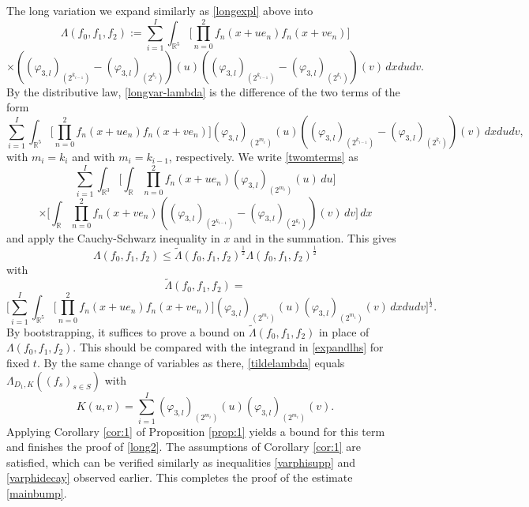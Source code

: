 \documentclass[12pt,reqno]{amsart}
\theoremstyle{plain}
\theoremstyle{definition}
\numberwithin{equation}{section}
\newcommand{\R}{{\mathbb R}}
\begin{document}
The long variation we expand similarly as  \eqref{longexpl} above into
\begin{equation}
    \label{longvar-lambda}
    \Lambda(f_0,f_1,f_2):= 
 \sum_{i=1}^I  \int_{\mathbb{R}^5} \Big[\prod_{n=0}^2 f_n(x+ue_n) 
f_n(x+ve_n) \Big]  \end{equation}
\[\times({(\varphi_{3,l})}_{(2^{k_{i-1}})}-{(\varphi_{3,l})}_{(2^{k_{i}})})(u) ({(\varphi_{3,l})}_{(2^{k_{i-1}})}-{(\varphi_{3,l})}_{(2^{k_{i}})})(v)
 \,dx du dv. \] 
By the distributive law, \eqref{longvar-lambda} is the difference of the two terms of the form
\begin{equation}\label{twomterms}
\sum_{i=1}^I  \int_{\mathbb{R}^5} \Big[\prod_{n=0}^2 f_n(x+ue_n) 
f_n(x+ve_n) \Big]  {(\varphi_{3,l})}_{(2^{m_{i}})}(u) ({(\varphi_{3,l})}_{(2^{k_{i-1}})}-{(\varphi_{3,l})}_{(2^{k_{i}})})(v)
 \,dx du dv,
 \end{equation}
 with $m_i = k_i$ and with $m_i = k_{i-1}$, respectively.
We write \eqref{twomterms} as
\[\sum_{i=1}^I  \int_{\mathbb{R}^3} \Big[\int_{\R}\prod_{n=0}^2 f_n(x+ue_n) {(\varphi_{3,l})}_{(2^{m_{i}})}(u)\,du
  \Big] \]
\[ \times \Big[\int_{\R}\prod_{n=0}^2  
f_n(x+ve_n)  ({(\varphi_{3,l})}_{(2^{k_{i-1}})}-{(\varphi_{3,l})}_{(2^{k_{i}})})(v)\,dv\Big] 
 \,dx \]
and apply the Cauchy-Schwarz inequality in $x$ and in the summation. This gives
\[\Lambda(f_0,f_1,f_2)\leq \widetilde{\Lambda}(f_0,f_1,f_2)^{\frac 12}\Lambda(f_0,f_1,f_2)^{\frac 12}\]
with
\begin{equation}\label{tildelambda}
\widetilde{\Lambda}(f_0,f_1,f_2)=
 \end{equation}
 \[\Big[ \sum_{i=1}^I  \int_{\mathbb{R}^5} \Big[ \prod_{n=0}^2 f_n(x+ue_n) f_n(x+ve_n) \Big]  {(\varphi_{3,l})}_{(2^{m_{i}})}(u){(\varphi_{3,l})}_{(2^{m_{i}})}(v)\,dxdudv
   \Big]^{\frac 12}. \] 
By bootstrapping, it suffices to prove a bound on $\widetilde{\Lambda}(f_0,f_1,f_2)$
in place of $\Lambda(f_0,f_1,f_2)$.
This should be compared with the integrand in \eqref{expandlhs} for fixed $t$.
By the same change of variables as there, \eqref{tildelambda} equals $\Lambda_{D_1,K}((f_s)_{s\in S})$ with 
\begin{equation}
    \label{longvar-lambda-ker}
    K(u,v) = \sum_{i=1}^I {(\varphi_{3,l})}_{(2^{m_{i}})}(u){(\varphi_{3,l})}_{(2^{m_{i}})}(v). 
\end{equation}
Applying Corollary \ref{cor:1} of Proposition \ref{prop:1} yields a bound for this term and 
    finishes the proof of  \eqref{long2}.  The assumptions of Corollary \ref{cor:1} are satisfied, which can be verified similarly as inequalities \eqref{varphisupp} and \eqref{varphidecay}  observed earlier. 
This completes the proof of the estimate \eqref{mainbump}.
\end{document}
